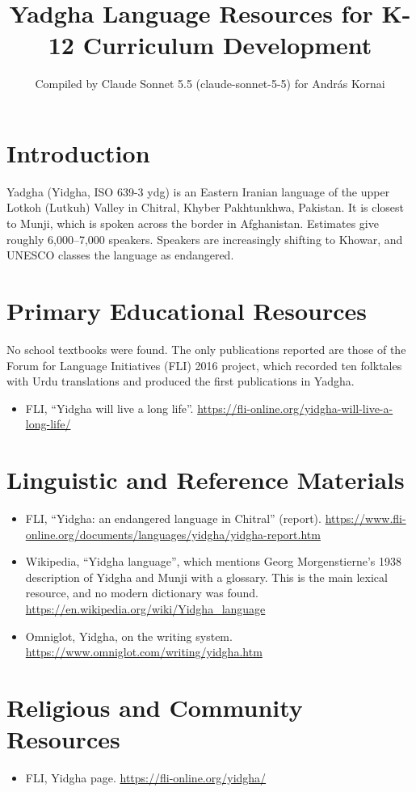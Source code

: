 \documentclass[12pt]{article}
\title{Yadgha Language Resources for K-12 Curriculum Development}
\author{Compiled by Claude Sonnet 5.5 (claude-sonnet-5-5) for Andr\'as Kornai}
\date{}
\begin{document}
\maketitle

\section{Introduction}
Yadgha (Yidgha, ISO 639-3 ydg) is an Eastern Iranian language of the upper Lotkoh (Lutkuh) Valley in Chitral, Khyber Pakhtunkhwa, Pakistan. It is closest to Munji, which is spoken across the border in Afghanistan. Estimates give roughly 6,000--7,000 speakers. Speakers are increasingly shifting to Khowar, and UNESCO classes the language as endangered.

\section{Primary Educational Resources}
No school textbooks were found. The only publications reported are those of the Forum for Language Initiatives (FLI) 2016 project, which recorded ten folktales with Urdu translations and produced the first publications in Yadgha.
\begin{itemize}
\item FLI, ``Yidgha will live a long life''. \url{https://fli-online.org/yidgha-will-live-a-long-life/}
\end{itemize}

\section{Linguistic and Reference Materials}
\begin{itemize}
\item FLI, ``Yidgha: an endangered language in Chitral'' (report). \url{https://www.fli-online.org/documents/languages/yidgha/yidgha-report.htm}
\item Wikipedia, ``Yidgha language'', which mentions Georg Morgenstierne's 1938 description of Yidgha and Munji with a glossary. This is the main lexical resource, and no modern dictionary was found. \url{https://en.wikipedia.org/wiki/Yidgha_language}
\item Omniglot, Yidgha, on the writing system. \url{https://www.omniglot.com/writing/yidgha.htm}
\end{itemize}

\section{Religious and Community Resources}
\begin{itemize}
\item FLI, Yidgha page. \url{https://fli-online.org/yidgha/}
\end{itemize}
\end{document}
